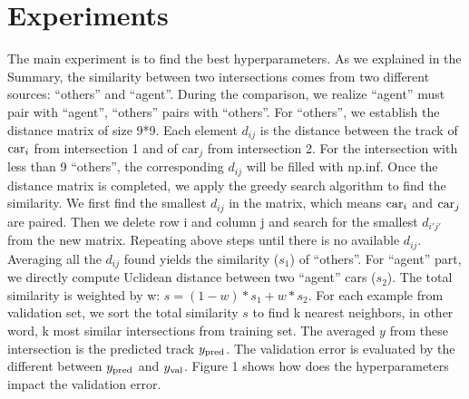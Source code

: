 \section{Experiments}
    The main experiment is to find the best hyperparameters. As we explained in the Summary, the similarity between two intersections comes from two different sources: ``others'' and ``agent''. During the comparison, we realize ``agent'' must pair with ``agent'', ``others'' pairs with ``others''. For ``others'', we establish the distance matrix of size 9*9. Each element $d_{ij}$ is the distance between the track of $\textnormal{car}_i$ from intersection 1 and of $\text{car}_j$ from intersection 2. For the intersection with less than 9 ``others'', the corresponding $d_{ij}$ will be filled with np.inf. Once the distance matrix is completed, we apply the greedy search algorithm to find the similarity. We first find the smallest $d_{ij}$ in the matrix, which means $\textnormal{car}_i$ and $\textnormal{car}_j$ are paired. Then we delete row i and column j and search for the smallest $d_{i'j'}$ from the new matrix. Repeating above steps until there is no available $d_{ij}$. Averaging all the $d_{ij}$ found yields the similarity ($s_1$) of ``others''. For ``agent'' part, we directly compute Uclidean distance between two ``agent'' cars ($s_2$). The total similarity is weighted by w: $s = (1-w)*s_1+w*s_2$. For each example from validation set, we sort the total similarity $s$ to find k nearest neighbors, in other word, k most similar intersections from training set. The averaged $y$ from these intersection is the predicted track $y_{\textnormal{pred}}$. The validation error is evaluated by the different between $y_{\textnormal{pred}}$ and $y_{\textnormal{val}}$. Figure 1 shows how does the hyperparameters impact the validation error.
